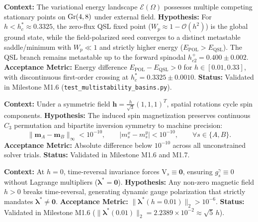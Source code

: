 \begin{contract}
\label{con:ph02_basin_separation}
\textbf{Context:} The variational energy landscape $\mathcal{E}(\Omega)$ possesses multiple competing stationary points on $\operatorname{Gr}(4, 8)$ under external field.
\textbf{Hypothesis:} For $h < h_c^* \approx 0.3325$, the zero-flux QSL fixed point ($W_p \approx 1 - \mathcal{O}(h^2)$) is the global ground state, while the field-polarized seed converges to a distinct metastable saddle/minimum with $W_p \ll 1$ and strictly higher energy ($E_{\mathrm{POL}} > E_{\mathrm{QSL}}$). The QSL branch remains metastable up to the forward spinodal $h_{c2}^+ = 0.400 \pm 0.002$.
\textbf{Acceptance Metric:} Energy difference $E_{\mathrm{POL}} - E_{\mathrm{QSL}} > 0$ for $h \in [0.01, 0.33]$, with discontinuous first-order crossing at $h_c^* = 0.3325 \pm 0.0010$.
\textbf{Status:} Validated in Milestone M1.6 (\texttt{test\_multistability\_basins.py}).
\end{contract}

\begin{contract}
\label{con:ph03_magnetization_isotropy}
\textbf{Context:} Under a symmetric field $\mathbf{h} = \frac{h}{\sqrt{3}}(1, 1, 1)^T$, spatial rotations cycle spin components.
\textbf{Hypothesis:} The induced spin magnetization preserves continuous $C_3$ permutation and bipartite inversion symmetry to machine precision:
\begin{equation}
\|\mathbf{m}_A - \mathbf{m}_B\|_\infty < 10^{-10}, \qquad |m_s^x - m_s^y| < 10^{-10}, \qquad \forall s \in \{A, B\}.
\end{equation}
\textbf{Acceptance Metric:} Absolute difference below $10^{-10}$ across all unconstrained solver trials.
\textbf{Status:} Validated in Milestone M1.6 and M1.7.
\end{contract}

\begin{contract}
\label{con:ph04_finite_multipliers}
\textbf{Context:} At $h = 0$, time-reversal invariance forces $\mathrm{V}_s \equiv \mathbf{0}$, ensuring $g_s^\gamma \equiv 0$ without Lagrange multipliers ($\boldsymbol{\lambda}^* = \mathbf{0}$).
\textbf{Hypothesis:} Any non-zero magnetic field $h > 0$ breaks time-reversal, generating dynamic gauge polarization that strictly mandates $\boldsymbol{\lambda}^* \neq \mathbf{0}$.
\textbf{Acceptance Metric:} $\|\boldsymbol{\lambda}^*(h=0.01)\|_2 > 10^{-6}$.
\textbf{Status:} Validated in Milestone M1.6 ($\|\boldsymbol{\lambda}^*(0.01)\|_2 = 2.2389 \times 10^{-2} \approx \sqrt{5}\, h$).
\end{contract}


